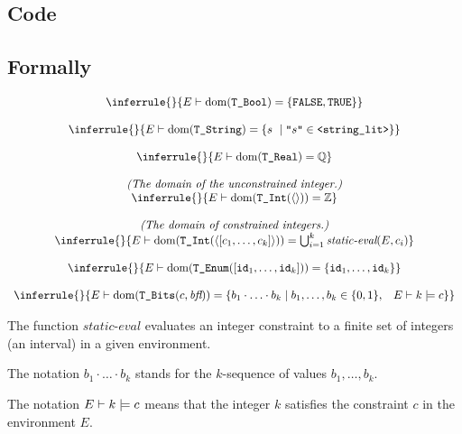 \documentclass{book}
\newcommand\RuleComment[1]{\textit{(#1)}}
\newcommand\unconstrainedinteger[0]{\TInt(\langle\rangle)}
\newcommand\staticeval[0]{\textit{static-eval}}
\begin{document}
  \subsection{Code}

\begin{emptyformal}
      \subsection{Formally}
      
\[
\begin{array}{c}
\inferrule{}{ E \entails \dom(\TBool) = \{\texttt{FALSE}, \texttt{TRUE}\} }\\
\\
\inferrule{}{ E \entails \dom(\TString) = \{ s\ \;|\; \texttt{"}s\texttt{"} \in \texttt{<string\_lit>} \} }\\
\\
\inferrule{}{ E \entails \dom(\TReal) = \Q }\\
\\
\RuleComment{The domain of the unconstrained integer.}\\
\inferrule{}{ E \entails \dom(\unconstrainedinteger) = \Z }\\
\\
\RuleComment{The domain of constrained integers.}\\
\inferrule{}{ E \entails \dom(\TInt(\langle [c_1,\ldots,c_k] \rangle)) = \bigcup_{i=1}^k \staticeval(E, c_i)}\\
\\
\inferrule{}{ E \entails \dom(\TEnum([\id_1,\ldots,\id_k])) = \{\id_1,\ldots,\id_k\}}\\
\\
\inferrule{}{ E \entails \dom(\TBits(c, \textit{bfl})) = \{ b_1\cdot\ldots\cdot b_k \;|\; b_1,\ldots,b_k \in \{0,1\}, \;\;\; E \entails k \models c   \} }\\
\end{array}
\]

The function $\staticeval$ evaluates an integer constraint to a finite set of integers (an interval) in a given environment.

The notation $b_1\cdot\ldots\cdot b_k$ stands for the $k$-sequence of values $b_1,\ldots,b_k$.

The notation $E \vdash k \models c$ means that the integer $k$ satisfies the constraint $c$ in the environment $E$. 

\begin{comment}
ROMAN: consider simplifying/elaborating on this.
\end{comment}
\end{emptyformal}
\end{document}
